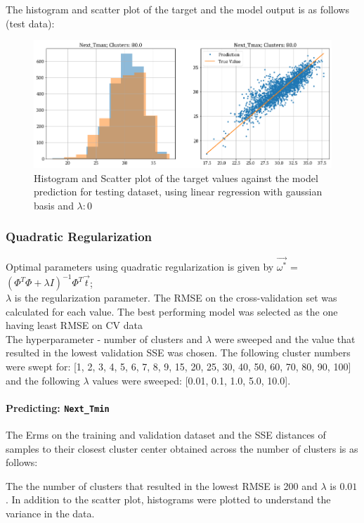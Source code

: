 \documentclass[12pt,a4paper]{article}
\newcommand{\noi}{\noindent}
\def\tt#1{\texttt{#1}}
\begin{document}
\noi
The histogram and scatter plot of the target and the model output is as follows (test data):
\begin{figure}[H]
    \centering
    \includegraphics[scale=0.49]{images/t3_d3/no_reg/T_max_test.png}
    \caption{Histogram and Scatter plot of the target values against the model prediction for testing dataset, using linear regression with gaussian basis and $\lambda: 0$}
\end{figure}

\subsubsection{Quadratic Regularization}
Optimal parameters using quadratic regularization is given by $\vec{\omega^*}$ = $(\Phi^T\Phi + \lambda I)^{-1} \Phi^T \vec{t}$;\\

\noi
$\lambda$ is the regularization parameter. The RMSE on the cross-validation set was calculated for each value. The best performing model was selected as the one having least RMSE on CV data \\

\noi
The hyperparameter - number of clusters and $\lambda$ were sweeped and the value that resulted in the lowest validation SSE was chosen. The following cluster numbers were swept for: [1, 2, 3, 4, 5, 6, 7, 8, 9, 15, 20, 25, 30, 40, 50, 60, 70, 80, 90, 100] and the following $\lambda$ values were sweeped: [0.01, 0.1,  1.0, 5.0, 10.0].

\paragraph{Predicting: \tt{Next\_Tmin}}
The Erms on the training and validation dataset and the SSE distances of samples to their closest cluster center obtained across the number of clusters is as follows:


\noi
The the number of clusters that resulted in the lowest RMSE is 200 and $\lambda$ is $0.01$. In addition to the scatter plot, histograms were plotted to understand the variance in the data.\\
\end{document}
